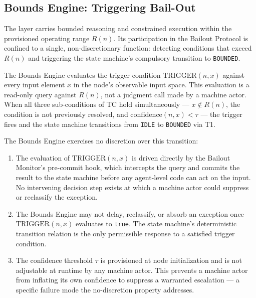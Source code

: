 \subsection{Bounds Engine: Triggering Bail-Out}\label{sec:bounds-trigger}

The \bounds{} layer carries bounded reasoning and constrained execution within the provisioned operating range $R(n)$. Its participation in the Bailout Protocol is confined to a single, non-discretionary function: detecting conditions that exceed $R(n)$ and triggering the state machine's compulsory transition to \texttt{BOUNDED}.

The Bounds Engine evaluates the trigger condition $\mathrm{TRIGGER}(n, x)$ against every input element $x$ in the node's observable input space. This evaluation is a read-only query against $R(n)$, not a judgment call made by a machine actor. When all three sub-conditions of TC hold simultaneously — $x \notin R(n)$, the condition is not previously resolved, and $\mathrm{confidence}(n, x) < \tau$ — the trigger fires and the state machine transitions from \texttt{IDLE} to \texttt{BOUNDED} via T1.

The Bounds Engine exercises no discretion over this transition:

\begin{enumerate}\itemsep=0pt
\item The evaluation of $\mathrm{TRIGGER}(n, x)$ is driven directly by the Bailout Monitor's pre-commit hook, which intercepts the query and commits the result to the state machine before any agent-level code can act on the input. No intervening decision step exists at which a machine actor could suppress or reclassify the exception.

\item The Bounds Engine may not delay, reclassify, or absorb an exception once $\mathrm{TRIGGER}(n, x)$ evaluates to \texttt{true}. The state machine's deterministic transition relation is the only permissible response to a satisfied trigger condition.

\item The confidence threshold $\tau$ is provisioned at node initialization and is not adjustable at runtime by any machine actor. This prevents a machine actor from inflating its own confidence to suppress a warranted escalation — a specific failure mode the no-discretion property addresses.
\end{enumerate}

